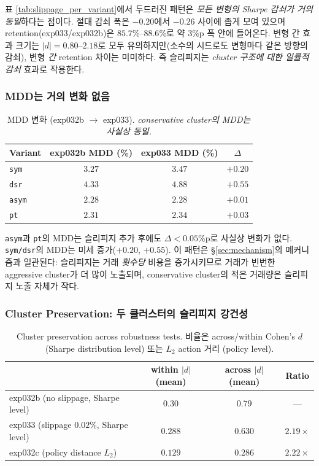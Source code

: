 \documentclass[11pt, a4paper]{article}
\begin{document}
표 \ref{tab:slippage_per_variant}에서 두드러진 패턴은 \emph{모든 변형의 Sharpe
감쇠가 거의 동일}하다는 점이다. 절대 감쇠 폭은 $-0.20$에서 $-0.26$ 사이에 좁게
모여 있으며 retention(exp033/exp032b)은 $85.7\%$--$88.6\%$로 약 3\%p 폭 안에
들어온다. 변형 간 효과 크기는 $|d| = 0.80$--$2.18$로 모두 유의하지만(소수의 시드로도
변형마다 같은 방향의 감쇠), 변형 \emph{간} retention 차이는 미미하다. 즉
슬리피지는 \emph{cluster 구조에 대한 일률적 감쇠} 효과로 작용한다.

\subsubsection{MDD는 거의 변화 없음}
\label{sec:slippage_mdd}

\begin{table}[!htbp]
\centering
\caption{MDD 변화 (exp032b $\to$ exp033). \textit{conservative cluster의 MDD는
사실상 동일.}}
\begin{tabular}{lccc}
\toprule
Variant & exp032b MDD (\%) & exp033 MDD (\%) & $\Delta$ \\
\midrule
\texttt{sym}  & $3.27$ & $3.47$ & $+0.20$ \\
\texttt{dsr}  & $4.33$ & $4.88$ & $+0.55$ \\
\texttt{asym} & $2.28$ & $2.28$ & $+0.01$ \\
\texttt{pt}   & $2.31$ & $2.34$ & $+0.03$ \\
\bottomrule
\end{tabular}
\label{tab:slippage_mdd}
\end{table}

\texttt{asym}과 \texttt{pt}의 MDD는 슬리피지 추가 후에도 $\Delta < 0.05$\%p로
사실상 변화가 없다. \texttt{sym/dsr}의 MDD는 미세 증가($+0.20$, $+0.55$). 이 패턴은
\S\ref{sec:mechanism}의 메커니즘과 일관된다: 슬리피지는 거래 \emph{횟수당} 비용을
증가시키므로 거래가 빈번한 aggressive cluster가 더 많이 노출되며, conservative
cluster의 적은 거래량은 슬리피지 노출 자체가 작다.

\subsubsection{Cluster Preservation: 두 클러스터의 슬리피지 강건성}
\label{sec:slippage_cluster}

\begin{table}[!htbp]
\centering
\caption{Cluster preservation across robustness tests. 비율은 across/within
Cohen's $d$ (Sharpe distribution level) 또는 $L_2$ action 거리 (policy level).}
\begin{tabular}{lccc}
\toprule
 & within $|d|$ (mean) & across $|d|$ (mean) & Ratio \\
\midrule
exp032b (no slippage, Sharpe level) & $0.30$ & $0.79$ & --- \\
exp033 (slippage $0.02\%$, Sharpe level) & $0.288$ & $0.630$ & $\mathbf{2.19\times}$ \\
exp032c (policy distance $L_2$) & $0.129$ & $0.286$ & $2.22\times$ \\
\bottomrule
\end{tabular}
\label{tab:cluster_preservation}
\end{table}
\end{document}

